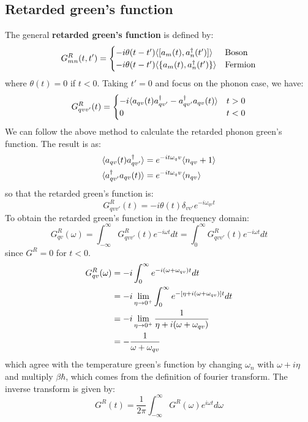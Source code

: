 \documentclass{article}
\begin{document}
\subsection*{Retarded green's function}
The general \textbf{retarded green's function} is defined by:
\begin{gather}
    G^R_{mn}(t,t') = 
    \begin{cases}
        -i \theta(t-t') \langle [a_m(t), a_n^{\dagger}(t')] \rangle & \text{Boson} \notag \\
        -i \theta(t-t') \langle \{a_m(t), a_n^{\dagger}(t')\} \rangle & \text{Fermion}
    \end{cases}
\end{gather}
where $\theta(t) = 0$ if $t < 0$.
Taking $t' = 0$ and focus on the phonon case, we have:
\begin{equation}
        G^R_{qvv'}(t) = 
        \begin{cases}
            -i \langle a_{qv}(t)a_{qv'}^{\dagger} - a_{qv'}^{\dagger} a_{qv}(t)\rangle & t > 0 \notag \\
            0 & t < 0
        \end{cases}
\end{equation}
We can follow the above method to calculate the retarded phonon green's function. The result is 
as:
\begin{align}
    \langle a_{qv}(t)a_{qv'}^{\dagger}\rangle &= e^{-it\omega_qv} \langle n_{qv} + 1 \rangle \notag \\
    \langle a_{qv'}^{\dagger}a_{qv}(t)\rangle &= e^{-it\omega_qv} \langle n_{qv} \rangle \notag
\end{align}
so that the retarded green's function is:
\begin{equation}
    G^R_{qvv'}(t) = -i \theta(t) \delta_{vv'} e^{-i\omega_{qv}t}
\end{equation}
To obtain the retarded green's function in the frequency domain:
\begin{equation}
    G^R_{qv}(\omega) = \int_{-\infty}^{\infty} G^R_{qvv'}(t) e^{-i\omega t} dt = \int_{0}^{\infty} G^R_{qvv'}(t) e^{-i\omega t} dt 
\end{equation}
since $G^R = 0$ for $t < 0$. 
\begin{align}
    G^R_{qv}(\omega) &= -i \int_{0}^{\infty} e^{-i(\omega + \omega_{qv})t} dt \notag \\
                     &= -i \lim_{\eta \to 0^+} \int_{0}^{\infty} e^{-[\eta + i(\omega + \omega_{qv})]t} dt \notag \\
                     &= -i \lim_{\eta \to 0^+} \frac{1}{\eta + i(\omega + \omega_{qv})} \\
                     &= -\frac{1}{\omega + \omega_{qv}}
\end{align}
which agree with the temperature green's function by changing $\omega_n$ with $\omega + i\eta$ and multiply $\beta\hbar$, which comes from
the definition of fourier transform.
The inverse transform is given by:
\begin{equation}
    G^R(t) = \frac{1}{2\pi} \int_{-\infty}^{\infty} G^R(\omega) e^{i\omega t} d\omega
\end{equation}
\end{document}
